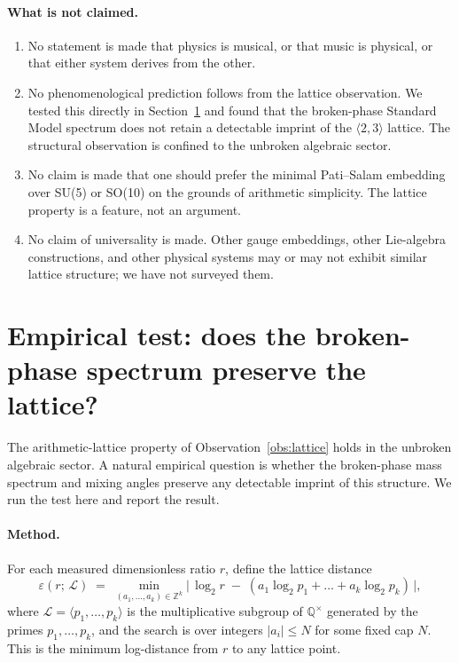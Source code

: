 \documentclass[11pt]{article}
\theoremstyle{plain}
\theoremstyle{remark}
\begin{document}
\paragraph{What is not claimed.}
\begin{enumerate}\itemsep0pt
  \item No statement is made that physics is musical, or that music
    is physical, or that either system derives from the other.
  \item No phenomenological prediction follows from the lattice
    observation.  We tested this directly in
    Section~\ref{sec:empirical} and found that the broken-phase
    Standard Model spectrum does not retain a detectable imprint of
    the $\langle 2, 3 \rangle$ lattice.  The structural observation
    is confined to the unbroken algebraic sector.
  \item No claim is made that one should prefer the minimal
    Pati--Salam embedding over SU(5) or SO(10) on the grounds of
    arithmetic simplicity.  The lattice property is a feature, not
    an argument.
  \item No claim of universality is made.  Other gauge embeddings,
    other Lie-algebra constructions, and other physical systems may
    or may not exhibit similar lattice structure; we have not
    surveyed them.
\end{enumerate}

\section{Empirical test: does the broken-phase spectrum preserve the lattice?}
\label{sec:empirical}

The arithmetic-lattice property of Observation~\ref{obs:lattice} holds
in the unbroken algebraic sector.  A natural empirical question is
whether the broken-phase mass spectrum and mixing angles preserve any
detectable imprint of this structure.  We run the test here and report
the result.

\paragraph{Method.}
For each measured dimensionless ratio $r$, define the lattice distance
\begin{equation}\label{eq:lattice-distance}
  \varepsilon(r;\, \mathcal{L}) \;=\;
  \min_{(a_1, \dots, a_k) \in \mathbb{Z}^k}
  \bigl|\, \log_2 r \;-\; (a_1 \log_2 p_1 + \dots + a_k \log_2 p_k)\,\bigr|,
\end{equation}
where $\mathcal{L} = \langle p_1, \dots, p_k \rangle$ is the
multiplicative subgroup of $\mathbb{Q}^\times$ generated by the
primes $p_1, \dots, p_k$, and the search is over integers $|a_i| \le N$
for some fixed cap $N$.  This is the minimum log-distance from $r$ to
any lattice point.
\end{document}
